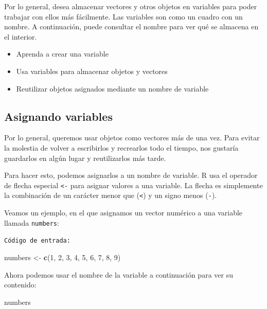 \documentclass[
]{book}
\newenvironment{Shaded}{\begin{snugshade}}{\end{snugshade}}
\newcommand{\DecValTok}[1]{\textcolor[rgb]{0.00,0.00,0.81}{#1}}
\newcommand{\KeywordTok}[1]{\textcolor[rgb]{0.13,0.29,0.53}{\textbf{#1}}}
\newcommand{\NormalTok}[1]{#1}
\newcommand{\StringTok}[1]{\textcolor[rgb]{0.31,0.60,0.02}{#1}}
\providecommand{\tightlist}{%
  \setlength{\itemsep}{0pt}\setlength{\parskip}{0pt}}
\begin{document}
Por lo general, desea almacenar vectores y otros objetos en variables para poder trabajar con ellos más fácilmente. Las variables son como un cuadro con un nombre. A continuación, puede consultar el nombre para ver qué se almacena en el interior.

\begin{itemize}
\tightlist
\item
  Aprenda a crear una variable
\item
  Usa variables para almacenar objetos y vectores
\item
  Reutilizar objetos asignados mediante un nombre de variable
\end{itemize}

\hypertarget{asignando-variables}{%
\subsection{Asignando variables}\label{asignando-variables}}

Por lo general, queremos usar objetos como vectores más de una vez. Para evitar la molestia de volver a escribirlos y recrearlos todo el tiempo, nos gustaría guardarlos en algún lugar y reutilizarlos más tarde.

Para hacer esto, podemos asignarlos a un nombre de variable. R usa el operador de flecha especial \texttt{\textless{}-} para asignar valores a una variable. La flecha es simplemente la combinación de un carácter menor que (\texttt{\textless{}}) y un signo menos (\texttt{-}).

Veamos un ejemplo, en el que asignamos un vector numérico a una variable llamada \texttt{numbers}:

\texttt{Código\ de\ entrada:}

\begin{Shaded}
\begin{Highlighting}[]
\NormalTok{numbers <-}\StringTok{ }\KeywordTok{c}\NormalTok{(}\DecValTok{1}\NormalTok{, }\DecValTok{2}\NormalTok{, }\DecValTok{3}\NormalTok{, }\DecValTok{4}\NormalTok{, }\DecValTok{5}\NormalTok{, }\DecValTok{6}\NormalTok{, }\DecValTok{7}\NormalTok{, }\DecValTok{8}\NormalTok{, }\DecValTok{9}\NormalTok{) }
\end{Highlighting}
\end{Shaded}

Ahora podemos usar el nombre de la variable a continuación para ver su contenido:

\begin{Shaded}
\begin{Highlighting}[]
\NormalTok{numbers}
\end{Highlighting}
\end{Shaded}
\end{document}
